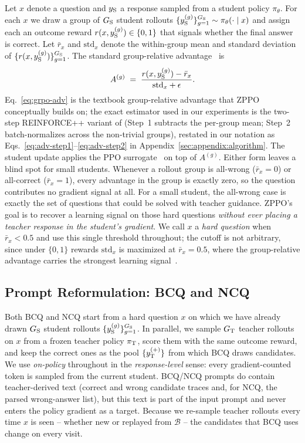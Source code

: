 \documentclass{llmxive}
\begin{document}
Let $x$ denote a question and $y_{\rm S}$ a response sampled from a student policy $\pi_\theta$. For each $x$ we draw a group of $G_{\rm S}$ student rollouts $\{y_{\rm S}^{(g)}\}_{g=1}^{G_{\rm S}} \sim \pi_\theta(\cdot \mid x)$ and assign each an outcome reward $r(x, y_{\rm S}^{(g)}) \in \{0, 1\}$ that signals whether the final answer is correct. Let $\bar{r}_x$ and $\mathrm{std}_x$ denote the within-group mean and standard deviation of $\{r(x, y_{\rm S}^{(g)})\}_{g=1}^{G_{\rm S}}$. The standard group-relative advantage~\citep{shao2024deepseekmath,yu2025dapo} is
\begin{equation}
A^{(g)} \;=\; \frac{r(x, y_{\rm S}^{(g)}) - \bar{r}_x}{\mathrm{std}_x + \epsilon}.
\label{eq:grpo-adv}
\end{equation}
Eq.~\eqref{eq:grpo-adv} is the textbook group-relative advantage that ZPPO conceptually builds on; the exact estimator used in our experiments is the two-step REINFORCE++ variant of \citet{hu2025reinforce++} (Step~1 subtracts the per-group mean; Step~2 batch-normalizes across the non-trivial groups), restated in our notation as Eqs.~\eqref{eq:adv-step1}--\eqref{eq:adv-step2} in Appendix~\ref{sec:appendix:algorithm}. The student update applies the PPO surrogate~\citep{schulman2017proximal} on top of $A^{(g)}$. Either form leaves a blind spot for small students. Whenever a rollout group is all-wrong ($\bar{r}_x\!=\!0$) or all-correct ($\bar{r}_x\!=\!1$), every advantage in the group is exactly zero, so the question contributes no gradient signal at all. For a small student, the all-wrong case is exactly the set of questions that could be solved with teacher guidance. ZPPO's goal is to recover a learning signal on those hard questions \emph{without ever placing a teacher response in the student's gradient}. We call $x$ a \emph{hard question} when $\bar{r}_x<0.5$ and use this single threshold throughout; the cutoff is not arbitrary, since under $\{0,1\}$ rewards $\mathrm{std}_x$ is maximized at $\bar{r}_x\!=\!0.5$, where the group-relative advantage carries the strongest learning signal~\citep{liu2025understanding}.

\subsection{Prompt Reformulation: BCQ and NCQ}
\label{sec:method:bcqncq}

Both BCQ and NCQ start from a hard question $x$ on which we have already drawn $G_{\rm S}$ student rollouts $\{y_{\rm S}^{(g)}\}_{g=1}^{G_{\rm S}}$. In parallel, we sample $G_{\rm T}$ teacher rollouts on $x$ from a frozen teacher policy $\pi_{\rm T}$, score them with the same outcome reward, and keep the correct ones as the pool $\{y_{\rm T}^{(+)}\}$ from which BCQ draws candidates. We use \emph{on-policy} throughout in the \emph{response-level} sense: every gradient-counted token is sampled from the current student. BCQ/NCQ prompts do contain teacher-derived text (correct and wrong candidate traces and, for NCQ, the parsed wrong-answer list), but this text is part of the input prompt and never enters the policy gradient as a target. Because we re-sample teacher rollouts every time $x$ is seen -- whether new or replayed from $\mathcal{B}$ -- the candidates that BCQ uses change on every visit.
\end{document}
